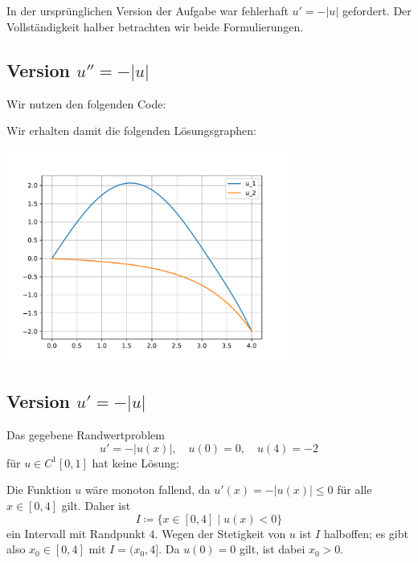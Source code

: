 \section{}

In der ursprünglichen Version der Aufgabe war fehlerhaft $u' = -|u|$ gefordert.
Der Vollständigkeit halber betrachten wir beide Formulierungen.



\subsection*{Version $u'' = -|u|$}

Wir nutzen den folgenden Code:



Wir erhalten damit die folgenden Lösungsgraphen:

\begin{center}
  \includegraphics[width = 0.7\textwidth]{chapter_04/exercise_04_22_figure_3.pdf}
\end{center}





\subsection*{Version $u' = -|u|$}

Das gegebene Randwertproblem
\[
        u' = -|u(x)|,
  \quad u(0) =  0,
  \quad u(4) = -2
\]
für $u \in C^1[0,1]$ hat keine Lösung:

Die Funktion $u$ wäre monoton fallend, da $u'(x) = -|u(x)| \leq 0$ für alle $x \in [0,4]$ gilt.
Daher ist
\[
            I
  \coloneqq \{
              x \in [0,4]
            \mid
              u(x) < 0
            \}
\]
ein Intervall mit Randpunkt $4$.
Wegen der Stetigkeit von $u$ ist $I$ halboffen;
es gibt also $x_0 \in [0,4]$ mit $I = (x_0, 4]$.
Da $u(0) = 0$ gilt, ist dabei $x_0 > 0$.

